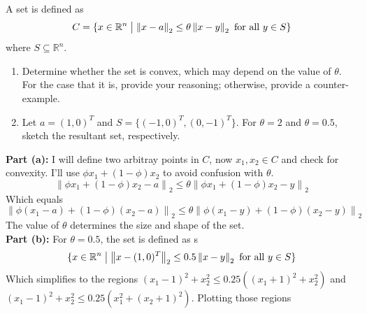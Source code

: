 \documentclass[11pt]{article}
\renewcommand{\norm}[1]{\left\lVert#1\right\rVert}
\begin{document}
\begin{homeworkProblem}

A set is defined as 
\[
    C = \{x \in \mathbb{R}^n \bigm\vert \norm{x-a}_2 \leq \theta \norm{x-y}_2 \text{ for all } y \in S\}
\]
where $S \subseteq \mathbb{R}^n$.
\begin{enumerate}[label=(\alph*), topsep=5pt]
    \item Determine whether the set is convex, which may depend on the value of $\theta$. For the case that it is,
    provide your reasoning; otherwise, provide a counter-example.
    \item Let $a = (1, 0)^T$ and $S = \{(-1, 0)^T, (0, -1)^T\}$. For $\theta = 2$ and $\theta = 0.5$, sketch the 
    resultant set, respectively.
\end{enumerate} \vspace{1\baselineskip}

\solution

\textbf{Part (a):} I will define two arbitray points in $C$, now $x_1, x_2 \in C$ and check for convexity. I'll use 
$\phi x_1 + (1 - \phi) x_2$ to avoid confusion with $\theta$.
\[
    \norm{\phi x_1 + (1 - \phi)x_2 - a}_2 \leq \theta \norm{\phi x_1 + (1 - \phi)x_2 - y}_2
\]
Which equals
\[
    \norm{\phi (x_1 - a) + (1 - \phi)(x_2 - a)}_2 \leq \theta \norm{\phi (x_1 - y) + (1 - \phi)(x_2 - y)}_2
\]
The value of $\theta$ determines the size and shape of the set. \\

\textbf{Part (b):} For $\theta = 0.5$, the set is defined as s
\[ 
    \{x \in \mathbb{R}^n \bigm\vert \norm{x-(1,0)^T}_2 \leq 0.5 \norm{x-y}_2 \text{ for all } y \in S\}
\]
Which simplifies to the regions $(x_1 - 1)^2 + x_2^2 \leq 0.25((x_1 + 1)^2 + x_2^2)$ and $(x_1 - 1)^2 + x_2^2 \leq 0.25(x_1^2 + (x_2 + 1)^2)$.
Plotting those regions

\begin{figure}[hbpt!]
    \centering
\end{figure}
\end{homeworkProblem}
\end{document}
